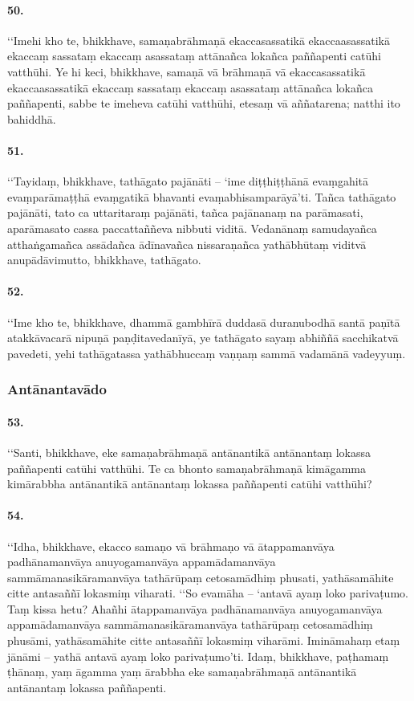 \paragraph{50.}
‘‘Imehi kho te, bhikkhave, samaṇabrāhmaṇā ekaccasassatikā ekaccaasassatikā ekaccaṃ sassataṃ ekaccaṃ asassataṃ attānañca lokañca paññapenti catūhi vatthūhi. Ye hi keci, bhikkhave, samaṇā vā brāhmaṇā vā ekaccasassatikā ekaccaasassatikā ekaccaṃ sassataṃ ekaccaṃ asassataṃ attānañca lokañca paññapenti, sabbe te imeheva catūhi vatthūhi, etesaṃ vā aññatarena; natthi ito bahiddhā.

\paragraph{51.}
‘‘Tayidaṃ, bhikkhave, tathāgato pajānāti – ‘ime diṭṭhiṭṭhānā evaṃgahitā evaṃparāmaṭṭhā evaṃgatikā bhavanti evaṃabhisamparāyā’ti. Tañca tathāgato pajānāti, tato ca uttaritaraṃ pajānāti, tañca pajānanaṃ na parāmasati, aparāmasato cassa paccattaññeva nibbuti viditā. Vedanānaṃ samudayañca atthaṅgamañca assādañca ādīnavañca nissaraṇañca yathābhūtaṃ viditvā anupādāvimutto, bhikkhave, tathāgato.
\paragraph{52.}
‘‘Ime kho te, bhikkhave, dhammā gambhīrā duddasā duranubodhā santā paṇītā atakkāvacarā nipuṇā paṇḍitavedanīyā, ye tathāgato sayaṃ abhiññā sacchikatvā pavedeti, yehi tathāgatassa yathābhuccaṃ vaṇṇaṃ sammā vadamānā vadeyyuṃ.

\subsubsection{Antānantavādo}

\paragraph{53.}
‘‘Santi, bhikkhave, eke samaṇabrāhmaṇā antānantikā antānantaṃ lokassa paññapenti catūhi vatthūhi. Te ca bhonto samaṇabrāhmaṇā kimāgamma kimārabbha antānantikā antānantaṃ lokassa paññapenti catūhi vatthūhi?

\paragraph{54.}
‘‘Idha, bhikkhave, ekacco samaṇo vā brāhmaṇo vā ātappamanvāya padhānamanvāya anuyogamanvāya appamādamanvāya sammāmanasikāramanvāya tathārūpaṃ cetosamādhiṃ phusati, yathāsamāhite citte antasaññī lokasmiṃ viharati. ‘‘So evamāha – ‘antavā ayaṃ loko parivaṭumo. Taṃ kissa hetu? Ahañhi ātappamanvāya padhānamanvāya anuyogamanvāya appamādamanvāya sammāmanasikāramanvāya tathārūpaṃ cetosamādhiṃ phusāmi, yathāsamāhite citte antasaññī lokasmiṃ viharāmi. Imināmahaṃ etaṃ jānāmi – yathā antavā ayaṃ loko parivaṭumo’ti. Idaṃ, bhikkhave, paṭhamaṃ ṭhānaṃ, yaṃ āgamma yaṃ ārabbha eke samaṇabrāhmaṇā antānantikā antānantaṃ lokassa paññapenti.

